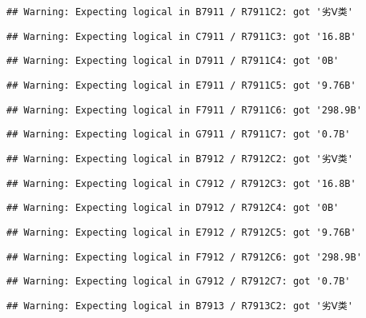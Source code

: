 \documentclass[
]{article}
\begin{document}
\begin{verbatim}
## Warning: Expecting logical in B7911 / R7911C2: got '劣Ⅴ类'
\end{verbatim}

\begin{verbatim}
## Warning: Expecting logical in C7911 / R7911C3: got '16.8B'
\end{verbatim}

\begin{verbatim}
## Warning: Expecting logical in D7911 / R7911C4: got '0B'
\end{verbatim}

\begin{verbatim}
## Warning: Expecting logical in E7911 / R7911C5: got '9.76B'
\end{verbatim}

\begin{verbatim}
## Warning: Expecting logical in F7911 / R7911C6: got '298.9B'
\end{verbatim}

\begin{verbatim}
## Warning: Expecting logical in G7911 / R7911C7: got '0.7B'
\end{verbatim}

\begin{verbatim}
## Warning: Expecting logical in B7912 / R7912C2: got '劣Ⅴ类'
\end{verbatim}

\begin{verbatim}
## Warning: Expecting logical in C7912 / R7912C3: got '16.8B'
\end{verbatim}

\begin{verbatim}
## Warning: Expecting logical in D7912 / R7912C4: got '0B'
\end{verbatim}

\begin{verbatim}
## Warning: Expecting logical in E7912 / R7912C5: got '9.76B'
\end{verbatim}

\begin{verbatim}
## Warning: Expecting logical in F7912 / R7912C6: got '298.9B'
\end{verbatim}

\begin{verbatim}
## Warning: Expecting logical in G7912 / R7912C7: got '0.7B'
\end{verbatim}

\begin{verbatim}
## Warning: Expecting logical in B7913 / R7913C2: got '劣Ⅴ类'
\end{verbatim}
\end{document}
